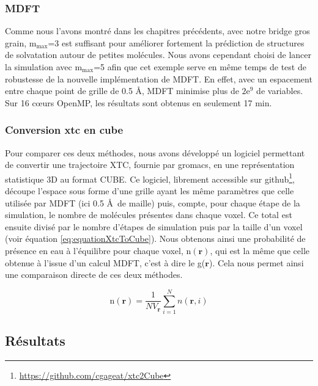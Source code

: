 \subsubsection{MDFT}
Comme nous l'avons montré dans les chapitres précédents, avec notre bridge gros grain, $\mathrm{m}_\mathrm{max}$=3 est suffisant pour améliorer fortement la prédiction de structures de solvatation autour de petites molécules. Nous avons cependant choisi de lancer la simulation avec $\mathrm{m}_\mathrm{max}$=5 afin que cet exemple serve en même temps de test de robustesse de la nouvelle implémentation de MDFT. En effet, avec un espacement entre chaque point de grille de 0.5 \AA, MDFT minimise plus de $2\mathrm{e}^9$ de variables. Sur 16 cœurs OpenMP, les résultats sont obtenus en seulement 17 min.


\subsubsection{Conversion xtc en cube}
Pour comparer ces deux méthodes, nous avons développé un logiciel permettant de convertir une trajectoire XTC, fournie par gromacs, en une représentation statistique 3D au format CUBE. Ce logiciel, librement accessible sur github\footnote{\url{https://github.com/cgageat/xtc2Cube}}, découpe l'espace sous forme d'une grille ayant les même paramètres que celle utilisée par MDFT (ici 0.5 \AA\ de maille) puis, compte, pour chaque étape de la simulation, le nombre de molécules présentes dans chaque voxel. Ce total est ensuite divisé par le nombre d'étapes de simulation puis par la taille d'un voxel (voir équation \ref{eq:equationXtcToCube}). Nous obtenons ainsi une probabilité de présence en eau à l'équilibre pour chaque voxel, $\mathrm{n}\left(\boldsymbol{r}\right)$, qui est la même que celle obtenue à l'issue d'un calcul MDFT, c'est à dire le g($\boldsymbol{r}$). Cela nous permet ainsi une comparaison directe de ces deux méthodes.

\begin{equation}\label{eq:equationXtcToCube}
\mathrm{n}\left(\boldsymbol{r}\right) = \frac{1}{NV_{\boldsymbol{r}}}\sum\limits_{i=1}^N n(\boldsymbol{r}, i)
\end{equation}
 

\subsection{Résultats}
